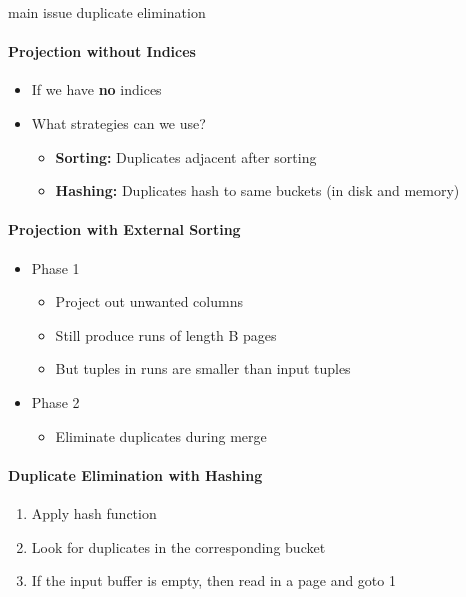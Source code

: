 main issue duplicate elimination

\paragraph{Projection without Indices}
\begin{itemize}
\item If we have \textbf{no} indices
\item What strategies can we use?
  \begin{itemize}
  \item \textbf{Sorting:} Duplicates adjacent after sorting
  \item \textbf{Hashing:} Duplicates hash to same buckets
    (in disk and memory)
  \end{itemize}
\end{itemize}

\paragraph{Projection with External Sorting}
\begin{itemize}
\item Phase 1
  \begin{itemize}
  \item Project out unwanted columns
  \item Still produce runs of length B pages
  \item But tuples in runs are smaller than input tuples
  \end{itemize}

\item Phase 2
  \begin{itemize}
  \item Eliminate duplicates during merge
  \end{itemize}
\end{itemize}

\paragraph{Duplicate Elimination with Hashing}
\begin{enumerate}
\item Apply hash function
\item Look for duplicates in the corresponding bucket
\item If the input buffer is empty, then read in a page and
  goto 1
\end{enumerate}

